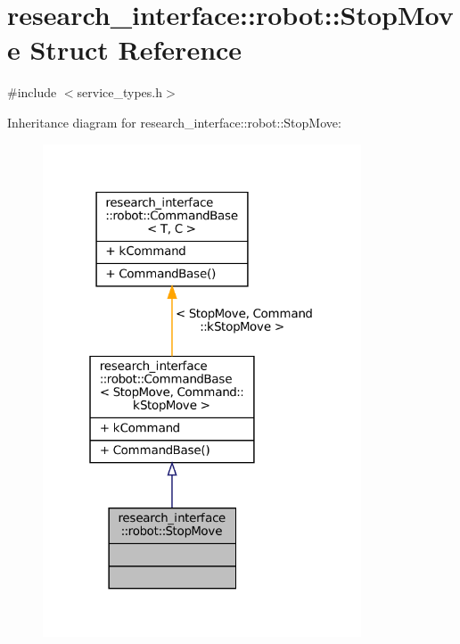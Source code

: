 \hypertarget{structresearch__interface_1_1robot_1_1StopMove}{}\section{research\+\_\+interface\+:\+:robot\+:\+:Stop\+Move Struct Reference}
\label{structresearch__interface_1_1robot_1_1StopMove}


{\ttfamily \#include $<$service\+\_\+types.\+h$>$}



Inheritance diagram for research\+\_\+interface\+:\+:robot\+:\+:Stop\+Move\+:
\nopagebreak
\begin{figure}[H]
\begin{center}
\leavevmode
\includegraphics[width=268pt]{structresearch__interface_1_1robot_1_1StopMove__inherit__graph}
\end{center}
\end{figure}



